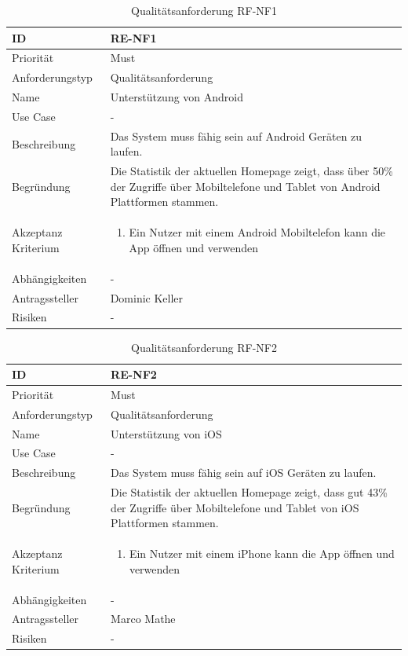 \begin{table}[ht]
\centering
  \begin{tabular}{ l | p{8cm} }
	\hline
	\rowcolor{gray}
	ID 			&	\textbf{RE-NF1}\\ \hline
	Priorität 		&	Must\\ \hline
	Anforderungstyp	&	Qualitätsanforderung\\ \hline
	Name 			&	Unterstützung von Android\\ \hline
	Use Case 		&	-\\ \hline
	Beschreibung 	&	Das System muss fähig sein auf Android Geräten zu laufen.\\ \hline
	Begründung 		&	Die Statistik der aktuellen Homepage zeigt, dass über 50\% der Zugriffe über Mobiltelefone und Tablet von Android Plattformen stammen.\\ \hline
	Akzeptanz Kriterium	&	\begin{enumerate}
					\item Ein Nutzer mit einem Android Mobiltelefon kann die App öffnen und verwenden
					\end{enumerate}
					\\ \hline
	Abhängigkeiten 	&	-\\ \hline
	Antragssteller 	&	Dominic Keller\\ \hline
	Risiken	 	&	-
  \end{tabular}
   \caption{Qualitätsanforderung RF-NF1}\label{table:req_nf_1}
\end{table}

\begin{table}[ht]
\centering
  \begin{tabular}{ l | p{8cm} }
	\hline
	\rowcolor{gray}
	ID 			&	\textbf{RE-NF2}\\ \hline
	Priorität 		&	Must\\ \hline
	Anforderungstyp	&	Qualitätsanforderung\\ \hline
	Name 			&	Unterstützung von iOS\\ \hline
	Use Case 		&	-\\ \hline
	Beschreibung 	&	Das System muss fähig sein auf iOS Geräten zu laufen.\\ \hline
	Begründung 		&	Die Statistik der aktuellen Homepage zeigt, dass gut 43\% der Zugriffe über Mobiltelefone und Tablet von iOS Plattformen stammen.\\ \hline
	Akzeptanz Kriterium	&	\begin{enumerate}
					\item Ein Nutzer mit einem iPhone kann die App öffnen und verwenden
					\end{enumerate}
					\\ \hline
	Abhängigkeiten 	&	-\\ \hline
	Antragssteller 	&	Marco Mathe\\ \hline
	Risiken	 	&	-
  \end{tabular}
   \caption{Qualitätsanforderung RF-NF2}\label{table:req_nf_2}
\end{table}


